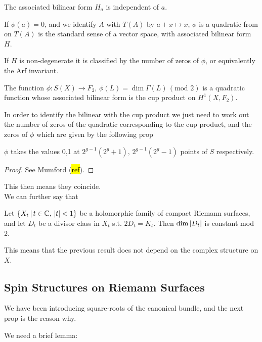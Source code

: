 \documentclass{article}
\begin{document}
\begin{lemma}
	The associated bilinear form $H_a$ is independent of $a$. 
\end{lemma}	
If $\phi(a)=0$, and we identify $A$ with $T(A)$ by $a+x \mapsto x$, $\phi$ is a quadratic from on $T(A)$ is the standard sense of a vector space, with associated bilinear form $H$. 
\begin{lemma}
If $H$ is non-degenerate it is classified by the number of zeros of $\phi$, or equivalently the Arf invariant. 
\end{lemma}

\begin{theorem}
	The function $\phi:S(X) \to F_2, \, \phi(L) = \dim \Gamma(L) \, (\text{mod } 2)$ is a quadratic function whose associated bilinear form is the cup product on $H^1(X,F_2)$. 
\end{theorem}
In order to identify the bilinear with the cup product we just need to work out the number of zeros of the quadratic corresponding to the cup product, and the zeros of $\phi$ which are given by the following prop
\begin{prop}
	$\phi$ takes the values 0,1 at $2^{g-1}(2^g+1), \, 2^{g-1}(2^g-1)$ points of $S$ respectively. 
\end{prop}
\begin{proof}
	See Mumford (\hl{ref}).
\end{proof}
This then means they coincide. \\
We can further say that 
\begin{theorem}
	Let $\left\{ X_t \, | \, t \in \mathbb{C}, \, \left\lvert t \right\rvert<1 \right\}$ be a holomorphic family of compact Riemann surfaces, and let $D_t$ be a divisor class in $X_t$ s.t. $2D_t = K_t$. Then $\dim \left\lvert D_t \right\rvert$ is constant mod 2.  
\end{theorem}
This means that the previous result does not depend on the complex structure on $X$. 

\subsection{Spin Structures on Riemann Surfaces}
We have been introducing square-roots of the canonical bundle, and the next prop is the reason why.

We need a brief lemma:
\end{document}
